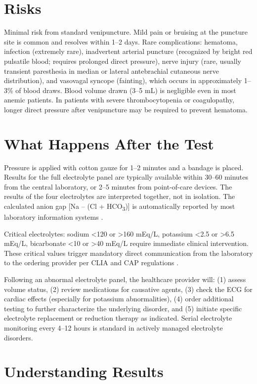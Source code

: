 \section*{Risks}
Minimal risk from standard venipuncture. Mild pain or bruising at the puncture site is common and resolves within 1--2 days. Rare complications: hematoma, infection (extremely rare), inadvertent arterial puncture (recognized by bright red pulsatile blood; requires prolonged direct pressure), nerve injury (rare, usually transient paresthesia in median or lateral antebrachial cutaneous nerve distribution), and vasovagal syncope (fainting), which occurs in approximately 1--3\% of blood draws. Blood volume drawn (3--5 mL) is negligible even in most anemic patients. In patients with severe thrombocytopenia or coagulopathy, longer direct pressure after venipuncture may be required to prevent hematoma.

\section*{What Happens After the Test}
Pressure is applied with cotton gauze for 1--2 minutes and a bandage is placed. Results for the full electrolyte panel are typically available within 30--60 minutes from the central laboratory, or 2--5 minutes from point-of-care devices. The results of the four electrolytes are interpreted together, not in isolation. The calculated anion gap [Na -- (Cl + HCO\textsubscript{3})] is automatically reported by most laboratory information systems \cite{wallach2022interpretation}.

Critical electrolytes: sodium <120 or >160 mEq/L, potassium <2.5 or >6.5 mEq/L, bicarbonate <10 or >40 mEq/L require immediate clinical intervention. These critical values trigger mandatory direct communication from the laboratory to the ordering provider per CLIA and CAP regulations \cite{tierney2023current}.

Following an abnormal electrolyte panel, the healthcare provider will: (1) assess volume status, (2) review medications for causative agents, (3) check the ECG for cardiac effects (especially for potassium abnormalities), (4) order additional testing to further characterize the underlying disorder, and (5) initiate specific electrolyte replacement or reduction therapy as indicated. Serial electrolyte monitoring every 4--12 hours is standard in actively managed electrolyte disorders.

\section*{Understanding Results}

